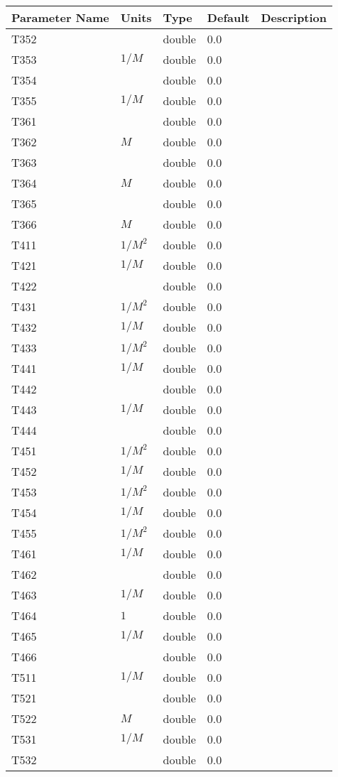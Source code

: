 \begin{tabular}{|l|l|l|l|p{\descwidth}|} \hline
Parameter Name & Units & Type & Default & Description \\ \hline 
T352 &  & double &  0.0 & \\ \hline 
T353 & $1/M$ & double &  0.0 & \\ \hline 
T354 &  & double &  0.0 & \\ \hline 
T355 & $1/M$ & double &  0.0 & \\ \hline 
T361 &  & double &  0.0 & \\ \hline 
T362 & $M$ & double &  0.0 & \\ \hline 
T363 &  & double &  0.0 & \\ \hline 
T364 & $M$ & double &  0.0 & \\ \hline 
T365 &  & double &  0.0 & \\ \hline 
T366 & $M$ & double &  0.0 & \\ \hline 
T411 & $1/M^2$ & double &  0.0 & \\ \hline 
T421 & $1/M$ & double &  0.0 & \\ \hline 
T422 &  & double &  0.0 & \\ \hline 
T431 & $1/M^2$ & double &  0.0 & \\ \hline 
T432 & $1/M$ & double &  0.0 & \\ \hline 
T433 & $1/M^2$ & double &  0.0 & \\ \hline 
T441 & $1/M$ & double &  0.0 & \\ \hline 
T442 &  & double &  0.0 & \\ \hline 
T443 & $1/M$ & double &  0.0 & \\ \hline 
T444 &  & double &  0.0 & \\ \hline 
T451 & $1/M^2$ & double &  0.0 & \\ \hline 
T452 & $1/M$ & double &  0.0 & \\ \hline 
T453 & $1/M^2$ & double &  0.0 & \\ \hline 
T454 & $1/M$ & double &  0.0 & \\ \hline 
T455 & $1/M^2$ & double &  0.0 & \\ \hline 
T461 & $1/M$ & double &  0.0 & \\ \hline 
T462 &  & double &  0.0 & \\ \hline 
T463 & $1/M$ & double &  0.0 & \\ \hline 
T464 & $1$ & double &  0.0 & \\ \hline 
T465 & $1/M$ & double &  0.0 & \\ \hline 
T466 &  & double &  0.0 & \\ \hline 
T511 & $1/M$ & double &  0.0 & \\ \hline 
T521 &  & double &  0.0 & \\ \hline 
T522 & $M$ & double &  0.0 & \\ \hline 
T531 & $1/M$ & double &  0.0 & \\ \hline 
T532 &  & double &  0.0 & \\ \hline 
\end{tabular}

